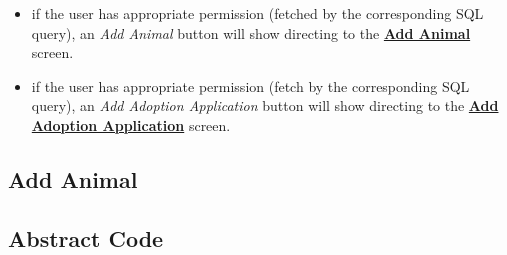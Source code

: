 \documentclass[a4paper]{article}
\begin{document}
\begin{itemize}
\begin{lstlisting}
	With current_num AS (
	SELECT species, count(distinct pet_id) as curr_count 
	FROM ANIMALINFO
	GROUP BY species)
	
    SELECT 
        species,
	    (limit_num - IFNULL(curr_count, 0)) AS available_space
	FROM <@\textcolor{blue}{Species}@>
	LEFT JOIN current_num ON Species.species = current_num.species;
	
	
	\end{lstlisting}
	\item if the user has appropriate permission (fetched by the corresponding SQL query), an \textit{Add Animal} button will show directing to the \underline{\textbf{Add Animal}} screen.
        \item if the user has appropriate permission (fetch by the corresponding SQL query), an \textit{Add Adoption Application} button will show directing to the \underline{\textbf{Add Adoption Application}} screen.
\end{itemize}

\hypertarget{add_animal}{\subsection{Add Animal}}

\subsection*{Abstract Code}
\end{document}

